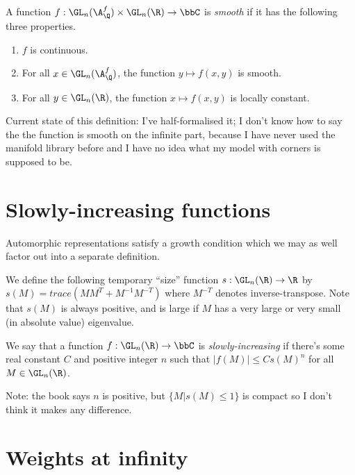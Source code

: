 \begin{definition}
  \label{AutomorphicForm.GLn.IsSmooth}
  A function $f:\GL_n(\A_{\Q}^f)\times\GL_n(\R)\to\bbC$ is \emph{smooth}
  if it has the following three properties.

  \begin{enumerate}
    \item $f$ is continuous.
    \item For all $x\in\GL_n(\A_{\Q}^f)$, the function $y\mapsto f(x,y)$ is smooth.
    \item For all $y\in\GL_n(\R)$, the function $x\mapsto f(x,y)$ is locally constant.
  \end{enumerate}
\end{definition}

Current state of this definition: I've half-formalised it; I don't know how to say the the
function is smooth on the infinite part, because I have never used the manifold library before
and I have no idea what my model with corners is supposed to be.

\section{Slowly-increasing functions}

Automorphic representations satisfy a growth condition which we may as well factor out
into a separate definition.

We define the following temporary ``size'' function $s:\GL_n(\R)\to\R$ by
$s(M)=trace(MM^T+M^{-1}M^{-T})$ where $M^{-T}$ denotes inverse-transpose. Note that
$s(M)$ is always positive, and is large if $M$ has a very large or very small
(in absolute value) eigenvalue.

\begin{definition}
  \label{AutomorphicForm.GLn.IsSlowlyIncreasing}
  \leanok
  We say that a function $f:\GL_n(\R)\to\bbC$ is \emph{slowly-increasing}
  if there's some real constant $C$ and positive integer $n$ such that $|f(M)|\leq Cs(M)^n$
  for all $M\in\GL_n(\R)$.
\end{definition}

Note: the book says $n$ is positive, but $\{M|s(M)\leq 1\}$ is compact so I don't
think it makes any difference.

\section{Weights at infinity}

